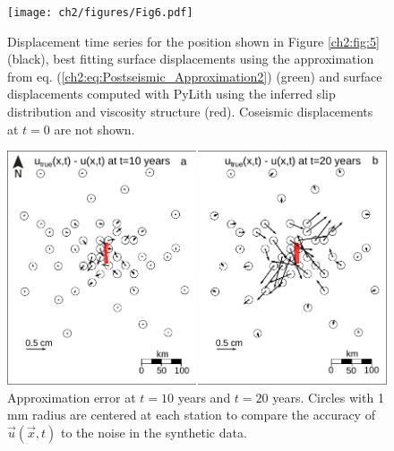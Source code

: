 \begin{figure}
\texttt{[image: ch2/figures/Fig6.pdf]}
\caption{Displacement time series for the position shown in Figure
\ref{ch2:fig:5} (black), best fitting surface displacements using the
approximation from eq. (\ref{ch2:eq:Postseismic_Approximation2})
(green) and surface displacements computed with PyLith using the
inferred slip distribution and viscosity structure (red). Coseismic
displacements at $t=0$ are not shown.}
\label{ch2:fig:6}
\end{figure}

\begin{figure}
\includegraphics{ch2/figures/Fig7.pdf}
\caption{Approximation error at $t=10$ years and $t=20$ years. Circles
with 1 mm radius are centered at each station to compare the accuracy
of $\vec{u}(\vec{x},t)$ to the noise in the synthetic data.}
\label{ch2:fig:7}
\end{figure}

